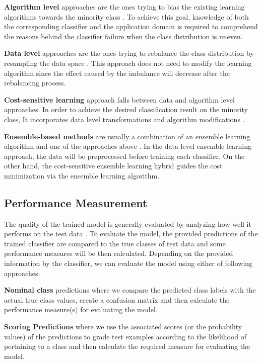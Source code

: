 \textbf{Algorithm level} approaches are the ones trying to bias the existing learning 
algorithms towards the minority class \cite{lin_support_2002}. 
To achieve this goal, knowledge of both the corresponding classifier and the application 
domain is required to comprehend the reasons behind the classifier failure when the 
class distribution is uneven. 
 
\textbf{Data level} approaches are the ones trying to rebalance the class distribution 
by resampling the data space \cite{batista_study_2004,fernandez_study_2008}. 
This approach does not need to modify the learning algorithm since the effect caused 
by the imbalance will decrease after the rebalancing process.
 
\textbf{Cost-sensitive learning} approach falls between data and algorithm level 
approaches. In order to achieve the desired classification result on the minority 
class, It incorporates data level transformations and algorithm modifications 
\cite{ling_test_2006,chawla_automatically_2008}.
 
\textbf{Ensemble-based methods} are usually a combination of an ensemble learning 
algorithm and one of the approaches above \cite{galar_review_2012}. In the data level ensemble learning 
approach, the data will be preprocessed before training each classifier. On the 
other hand, the  cost-sensitive ensemble learning hybrid guides the cost minimization 
via the ensemble learning algorithm. 

\subsection{Performance Measurement}
The quality of the trained model is generally evaluated by analyzing how well it performs on the test data 
\cite{alsheikh-ali_public_2011}. To evaluate the model, the provided predictions of the trained classifier 
are compared to the true classes of test data and some performance measures will be then calculated. 
Depending on the provided information by the classifier, we can evaluate the model using either of following approaches:

\textbf{Nominal class} predictions where we compare the predicted class labels with the actual true class values, 
create a confusion matrix and then calculate the performance measure(s) for evaluating the model.

\textbf{Scoring Predictions} where we use the associated scores (or the probability values) of the predictions 
to grade test examples according to the likelihood of pertaining to a class and then calculate the required 
measure for evaluating the model.

